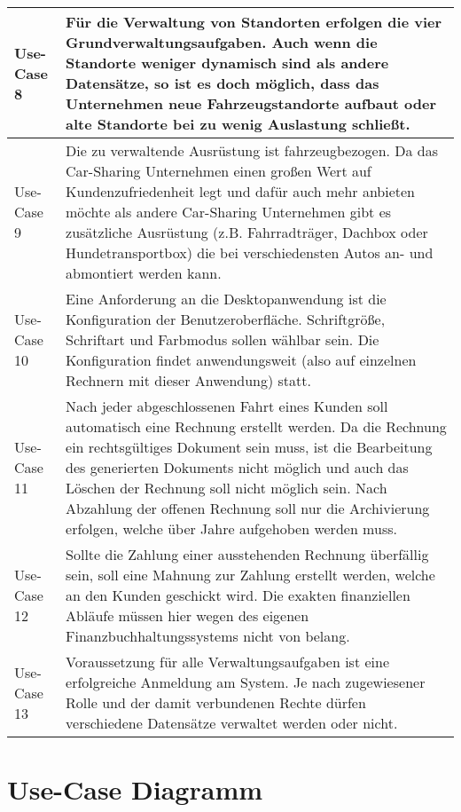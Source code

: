 \begin{tabular}{l | p{13cm}}
    \hline
    Use-Case 8 & Für die Verwaltung von Standorten erfolgen die vier Grundverwaltungsaufgaben. Auch wenn die Standorte weniger dynamisch sind als andere Datensätze, so ist es doch möglich, dass das Unternehmen neue Fahrzeugstandorte aufbaut oder alte Standorte bei zu wenig Auslastung schließt. \\
    \hline
    Use-Case 9 & Die zu verwaltende Ausrüstung ist fahrzeugbezogen. Da das Car-Sharing Unternehmen einen großen Wert auf Kundenzufriedenheit legt und dafür auch mehr anbieten möchte als andere Car-Sharing Unternehmen gibt es zusätzliche Ausrüstung (z.B. Fahrradträger, Dachbox oder Hundetransportbox) die bei verschiedensten Autos an- und abmontiert werden kann. \\
    \hline
    Use-Case 10 & Eine Anforderung an die Desktopanwendung ist die Konfiguration der Benutzeroberfläche. Schriftgröße, Schriftart und Farbmodus sollen wählbar sein. Die Konfiguration findet anwendungsweit (also auf einzelnen Rechnern mit dieser Anwendung) statt.\\
    \hline
    Use-Case 11 & Nach jeder abgeschlossenen Fahrt eines Kunden soll automatisch eine Rechnung erstellt werden. Da die Rechnung ein rechtsgültiges Dokument sein muss, ist die Bearbeitung des generierten Dokuments nicht möglich und auch das Löschen der Rechnung soll nicht möglich sein. Nach Abzahlung der offenen Rechnung soll nur die Archivierung erfolgen, welche über Jahre aufgehoben werden muss.\\ 
    \hline
    Use-Case 12 & Sollte die Zahlung einer ausstehenden Rechnung überfällig sein, soll eine Mahnung zur Zahlung erstellt werden, welche an den Kunden geschickt wird. Die exakten finanziellen Abläufe müssen hier wegen des eigenen Finanzbuchhaltungssystems nicht von belang. \\
    \hline
    Use-Case 13 & Voraussetzung für alle Verwaltungsaufgaben ist eine erfolgreiche Anmeldung am System. Je nach zugewiesener Rolle und der damit verbundenen Rechte dürfen verschiedene Datensätze verwaltet werden oder nicht.\\
    \hline

\end{tabular}

\newpage

\section{Use-Case Diagramm}